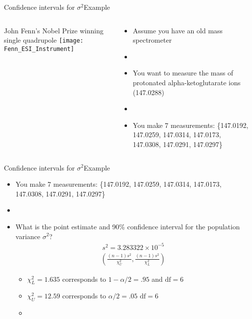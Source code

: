 \documentclass[xcolor=dvipsnames]{beamer}
\begin{document}
\begin{frame}{Confidence intervals for $\sigma^2$}{Example}
	\begin{columns}
		\begin{column}{.5 \textwidth}
			 John Fenn's Nobel Prize winning single quadrupole
			\texttt{[image: Fenn\_ESI\_Instrument]}
		\end{column}
		\begin{column}{.5\textwidth}
			\begin{itemize}
				\item Assume you have an old mass spectrometer \pause
				\item[]
				\item You want to measure the mass of protonated alpha-ketoglutarate ions (147.0288) \pause
				\item[]
				\item You make 7 measurements: \{147.0192, 147.0259, 147.0314, 147.0173, 147.0308, 147.0291, 147.0297\}
			\end{itemize}
		\end{column}
	\end{columns}
\end{frame}

\begin{frame}{Confidence intervals for $\sigma^2$}{Example}
	\begin{itemize}
		\item You make 7 measurements: \{147.0192, 147.0259, 147.0314, 147.0173, 147.0308, 147.0291, 147.0297\} \pause
		\item[]
		\item What is the point estimate and 90\% confidence interval for the population variance $\sigma^2$? \pause
		\begin{gather*}
			s^2 = 3.283322 \times 10^{-5}
		\end{gather*} \pause
		\begin{gather*}
			\left(\frac{(n-1) s^2}{\chi_U^2}, \frac{(n-1)s^2}{\chi_L^2} \right)
		\end{gather*} \pause
		
		\begin{itemize}
			\item $\chi^2_L = 1.635$ corresponds to $1 - \alpha / 2 =.95$ and $\text{df} = 6$ \pause
			\item $\chi^2_U = 12.59$ corresponds to $\alpha / 2 = .05$ $\text{df} = 6$
			\item[]
		\end{itemize}
	\end{itemize}
\end{frame}
\end{document}
